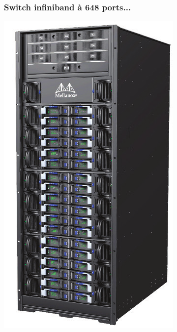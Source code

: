 \documentclass[xcolor={x11names,svgnames}]{beamer}
\begin{document}
\begin{frame}
  \frametitle{Switch infiniband à 648 ports...}
  \centering
  \includegraphics[height=0.75\textheight]{infiniband.png}
\end{frame}

\end{document}
